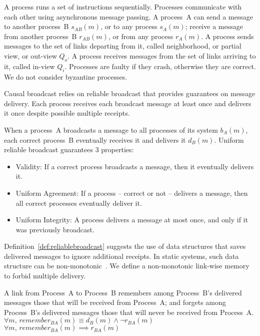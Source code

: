 \begin{definition}[Process]
  A process runs a set of instructions sequentially. Processes communicate with
  each other using asynchronous message passing. A process~A can send a message
  to another process~B $s_{AB}(m)$, or to any process $s_A(m)$; receive a
  message from another process~B $r_{AB}(m)$, or from any process $r_A(m)$. A
  process sends messages to the set of links departing from it, called
  neighborhood, or partial view, or out-view $Q_o$. A process receives messages
  from the set of links arriving to it, called in-view $Q_i$.  Processes are
  faulty if they crash, otherwise they are correct. We do not consider byzantine
  processes.
\end{definition}

Causal broadcast relies on reliable broadcast that provides guarantees on
message delivery. Each process receives each broadcast message at least once and
delivers it once despite possible multiple receipts.

\begin{definition} 
  When a process~A broadcasts a message to all processes of its system $b_A(m)$,
  each correct process~B eventually receives it and delivers it
  $d_B(m)$. Uniform reliable broadcast guarantees 3 properties:
  \begin{itemize}[leftmargin=*]
  \item Validity: If a correct process broadcasts a message, then it
    eventually delivers it.
  \item Uniform Agreement: If a process -- correct or not -- delivers a message,
    then all correct processes eventually deliver it.
  \item Uniform Integrity: A process delivers a message at most once, and only if
    it was previously broadcast.
  \end{itemize}
\end{definition}

Definition~\ref{def:reliablebroadcast} suggests the use of data structures that
saves delivered messages to ignore additional receipts. In static systems, such
data structure can be non-monotonic~\cite{raynal2013distributed}. We define a
non-monotonic link-wise memory to forbid multiple delivery.

\begin{definition}
  A link from Process~A to Process~B remembers among Process~B's delivered
  messages those that will be received from Process~A; and forgets among
  Process~B's delivered messages those that will never be received from
  Process~A.\\
  $\forall m,\, remember_{BA}(m) \equiv d_B(m) \wedge \neg r_{BA}(m)$ \\
  $\forall m,\, remember_{BA}(m) \implies r_{BA}(m)$
\end{definition}


